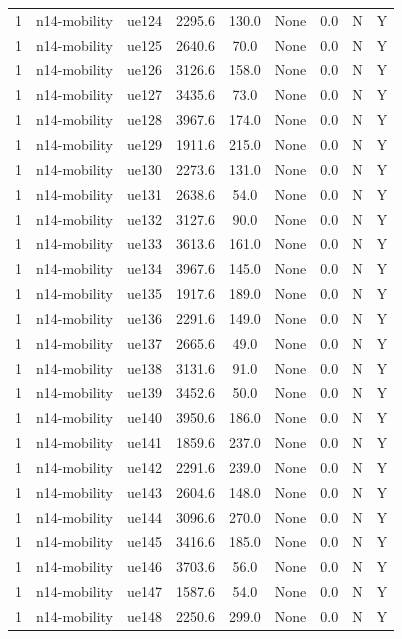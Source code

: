 \begin{table}[ht]
\begin{tabular}{|c|c|c|c|c|c|c|c|c|}
1 & n14-mobility & ue124 & 2295.6 & 130.0 & None & 0.0 & N & Y \\
1 & n14-mobility & ue125 & 2640.6 & 70.0 & None & 0.0 & N & Y \\
1 & n14-mobility & ue126 & 3126.6 & 158.0 & None & 0.0 & N & Y \\
1 & n14-mobility & ue127 & 3435.6 & 73.0 & None & 0.0 & N & Y \\
1 & n14-mobility & ue128 & 3967.6 & 174.0 & None & 0.0 & N & Y \\
1 & n14-mobility & ue129 & 1911.6 & 215.0 & None & 0.0 & N & Y \\
1 & n14-mobility & ue130 & 2273.6 & 131.0 & None & 0.0 & N & Y \\
1 & n14-mobility & ue131 & 2638.6 & 54.0 & None & 0.0 & N & Y \\
1 & n14-mobility & ue132 & 3127.6 & 90.0 & None & 0.0 & N & Y \\
1 & n14-mobility & ue133 & 3613.6 & 161.0 & None & 0.0 & N & Y \\
1 & n14-mobility & ue134 & 3967.6 & 145.0 & None & 0.0 & N & Y \\
1 & n14-mobility & ue135 & 1917.6 & 189.0 & None & 0.0 & N & Y \\
1 & n14-mobility & ue136 & 2291.6 & 149.0 & None & 0.0 & N & Y \\
1 & n14-mobility & ue137 & 2665.6 & 49.0 & None & 0.0 & N & Y \\
1 & n14-mobility & ue138 & 3131.6 & 91.0 & None & 0.0 & N & Y \\
1 & n14-mobility & ue139 & 3452.6 & 50.0 & None & 0.0 & N & Y \\
1 & n14-mobility & ue140 & 3950.6 & 186.0 & None & 0.0 & N & Y \\
1 & n14-mobility & ue141 & 1859.6 & 237.0 & None & 0.0 & N & Y \\
1 & n14-mobility & ue142 & 2291.6 & 239.0 & None & 0.0 & N & Y \\
1 & n14-mobility & ue143 & 2604.6 & 148.0 & None & 0.0 & N & Y \\
1 & n14-mobility & ue144 & 3096.6 & 270.0 & None & 0.0 & N & Y \\
1 & n14-mobility & ue145 & 3416.6 & 185.0 & None & 0.0 & N & Y \\
1 & n14-mobility & ue146 & 3703.6 & 56.0 & None & 0.0 & N & Y \\
1 & n14-mobility & ue147 & 1587.6 & 54.0 & None & 0.0 & N & Y \\
1 & n14-mobility & ue148 & 2250.6 & 299.0 & None & 0.0 & N & Y \\

\end{tabular}
\end{table}
